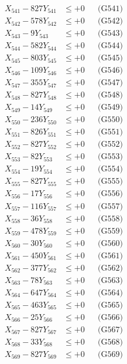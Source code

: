 \documentclass[a4paper,10pt]{article}
\begin{document}
{\begin{align}
\allowbreak
X_{541} - 827Y_{541} &\leq +0 && \text{(G541)} \\
X_{542} - 578Y_{542} &\leq +0 && \text{(G542)} \\
X_{543} - 9Y_{543} &\leq +0 && \text{(G543)} \\
X_{544} - 582Y_{544} &\leq +0 && \text{(G544)} \\
X_{545} - 803Y_{545} &\leq +0 && \text{(G545)} \\
X_{546} - 109Y_{546} &\leq +0 && \text{(G546)} \\
X_{547} - 355Y_{547} &\leq +0 && \text{(G547)} \\
X_{548} - 827Y_{548} &\leq +0 && \text{(G548)} \\
X_{549} - 14Y_{549} &\leq +0 && \text{(G549)} \\
X_{550} - 236Y_{550} &\leq +0 && \text{(G550)} \\
\allowbreak
X_{551} - 826Y_{551} &\leq +0 && \text{(G551)} \\
X_{552} - 827Y_{552} &\leq +0 && \text{(G552)} \\
X_{553} - 82Y_{553} &\leq +0 && \text{(G553)} \\
X_{554} - 19Y_{554} &\leq +0 && \text{(G554)} \\
X_{555} - 827Y_{555} &\leq +0 && \text{(G555)} \\
X_{556} - 17Y_{556} &\leq +0 && \text{(G556)} \\
X_{557} - 116Y_{557} &\leq +0 && \text{(G557)} \\
X_{558} - 36Y_{558} &\leq +0 && \text{(G558)} \\
X_{559} - 478Y_{559} &\leq +0 && \text{(G559)} \\
X_{560} - 30Y_{560} &\leq +0 && \text{(G560)} \\
\allowbreak
X_{561} - 450Y_{561} &\leq +0 && \text{(G561)} \\
X_{562} - 377Y_{562} &\leq +0 && \text{(G562)} \\
X_{563} - 78Y_{563} &\leq +0 && \text{(G563)} \\
X_{564} - 647Y_{564} &\leq +0 && \text{(G564)} \\
X_{565} - 463Y_{565} &\leq +0 && \text{(G565)} \\
X_{566} - 25Y_{566} &\leq +0 && \text{(G566)} \\
X_{567} - 827Y_{567} &\leq +0 && \text{(G567)} \\
X_{568} - 33Y_{568} &\leq +0 && \text{(G568)} \\
X_{569} - 827Y_{569} &\leq +0 && \text{(G569)} \\

\end{align}}
\end{document}
